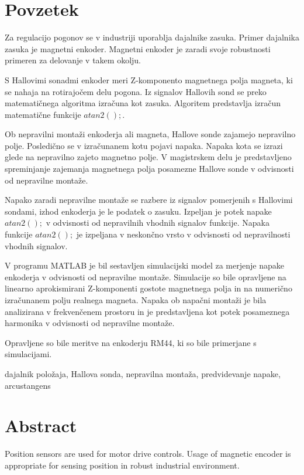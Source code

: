 \documentclass[a4paper,twoside,openright,12pt]{book}
\begin{document}
\chapter*{Povzetek}


Za regulacijo pogonov se v industriji uporablja dajalnike zasuka.
Primer dajalnika zasuka je magnetni enkoder.
Magnetni enkoder je zaradi svoje robustnosti primeren za delovanje v takem okolju.

S Hallovimi sonadmi enkoder meri Z-komponento magnetnega polja magneta, ki se nahaja na rotirajočem delu pogona.
Iz signalov Hallovih sond se preko matematičnega algoritma izračuna kot zasuka.
Algoritem predstavlja izračun matematične funkcije $atan2();$.

Ob nepravilni montaži enkoderja ali magneta, Hallove sonde zajamejo nepravilno polje. Posledično se v izračunanem kotu pojavi napaka.
Napaka kota se izrazi glede na nepravilno zajeto magnetno polje. V magistrskem delu je predstavljeno spreminjanje zajemanja magnetnega polja posamezne Hallove sonde v odvisnosti od nepravilne montaže.

Napako zaradi nepravilne montaže se razbere iz signalov pomerjenih s Hallovimi sondami, izhod enkoderja je le podatek o zasuku.
Izpeljan je potek napake  $atan2();$ v odvisnosti od nepravilnih vhodnih signalov funkcije. Napaka funkcije $atan2();$  je izpeljana v neskončno vrsto v odvisnosti od nepravilnosti vhodnih signalov.

V programu MATLAB je bil sestavljen simulacijski model za merjenje napake enkoderja v odvisnosti od nepravilne montaže.
Simulacije so bile opravljene na linearno aprokismirani Z-komponenti gostote magnetnega polja in na numerično izračunanem polju realnega magneta.
Napaka ob napačni montaži je bila analizirana v frekvenčenem prostoru in je predstavljena kot potek posameznega harmonika v odvisnosti od nepravilne montaže.

Opravljene so bile meritve na enkoderju RM44, ki so bile primerjane s simulacijami.

\kljucnebesede  dajalnik položaja, Hallova sonda, nepravilna montaža, predvidevanje napake, arcustangens
\chapter*{Abstract}

Position sensors are used for motor drive controls.
Usage of magnetic encoder is appropriate for sensing position in robust industrial environment.
\end{document}
